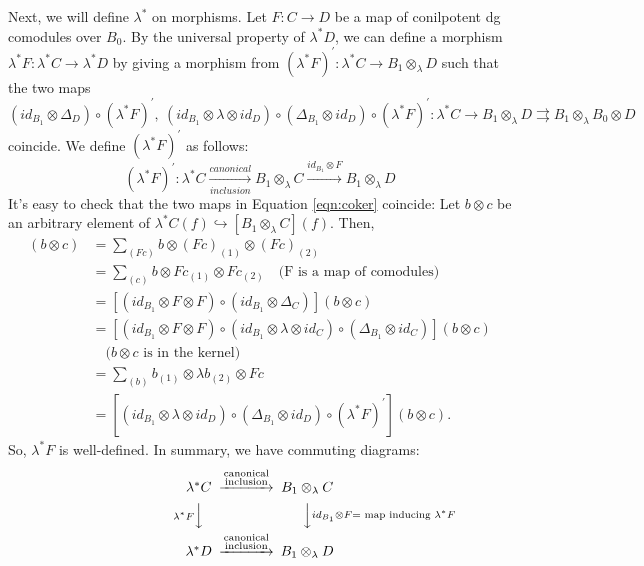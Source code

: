 Next, we will define $\lambda^*$ on morphisms.
Let $F:C\to D$ be a map of conilpotent 
dg comodules over $B_0$. 
By the universal property of $\lambda^*D$, we can define a 
morphism $\lambda^*F:\lambda^*C \to \lambda^*D$ by giving a 
morphism from $(\lambda^*F)^\prime:\lambda^*C \to 
B_1 \otimes_\lambda D$ such that the two maps 
\begin{equation}\label{eqn:coker}
(id_{B_1}\otimes \Delta_D) \circ (\lambda^*F)^\prime, \>
(id_{B_1}\otimes \lambda \otimes id_D)\circ 
(\Delta_{B_1}\otimes id_D) \circ (\lambda^*F)^\prime: 
\lambda^*C \to B_1 \otimes_\lambda D 
\rightrightarrows
B_1 \otimes_\lambda B_0 \otimes D
\end{equation}
coincide. We define $(\lambda^*F)^\prime$ as follows:
$$
(\lambda^*F)^\prime:
\lambda^*C
\xrightarrow[inclusion]{canonical}
B_1 \otimes_\lambda C 
\xrightarrow{id_{B_1}\otimes F}
B_1 \otimes_\lambda D
$$
It's easy to check that the two maps in Equation 
\ref{eqn:coker} coincide: 
Let $b\otimes c$ be an arbitrary element of $\lambda^*C(f)
\hookrightarrow [B_1\otimes_\lambda C](f)$. 
Then,
\begin{align*}
[(id_{B_1}\otimes \Delta_D) \circ (\lambda^*F)^\prime] (b\otimes c) 
&= \sum \limits_{(Fc)} b \otimes (Fc)_{(1)} \otimes (Fc)_{(2)} \\
&= \sum \limits_{(c)} b \otimes Fc_{(1)} \otimes Fc_{(2)} 
\quad \textrm{(F is a map of comodules)}\\
&= [(id_{B_1}\otimes F \otimes F) \circ (id_{B_1}\otimes \Delta_C)] 
(b\otimes c) \\
&= [(id_{B_1}\otimes F\otimes F) \circ 
(id_{B_1}\otimes \lambda \otimes id_C)\circ 
(\Delta_{B_1}\otimes id_C)] (b\otimes c)\\
&\quad \textrm{($b\otimes c$ is in the kernel)}\\
&= \sum \limits_{(b)} b_{(1)}\otimes \lambda b_{(2)} \otimes Fc \\
&= [(id_{B_1}\otimes \lambda \otimes id_D)\circ 
(\Delta_{B_1}\otimes id_D) \circ (\lambda^*F)^\prime] 
(b \otimes c).
\end{align*}
So, $\lambda^*F$ is well-defined. In summary, we have commuting 
diagrams:
\begin{equation}\label{cd:lambda^*f}
\begin{CD}
\lambda^*C
@>\substack{\textrm{canonical}\\ \textrm{inclusion}}>>
B_1\otimes_\lambda C \\
@V\lambda^*FVV 
@VVid_{B_1}\otimes F = \textrm{ map inducing } \lambda^*FV \\
\lambda^*D
@>\substack{\textrm{canonical}\\ \textrm{inclusion}}>>
B_1\otimes_\lambda D
\end{CD}
\end{equation}
